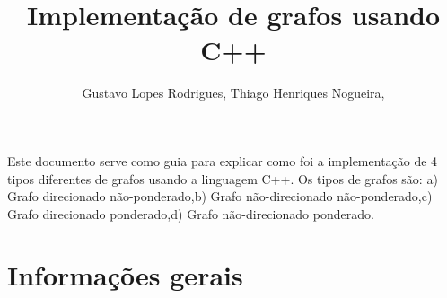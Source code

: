 \documentclass[12pt]{article}
\title{Implementação de grafos usando C++}
\author{Gustavo Lopes Rodrigues\inst{1}, Thiago Henriques Nogueira\inst{2},}
\begin{document}
 

\maketitle

\begin{resumo} 
  Este documento serve como guia para explicar como 
  foi a implementação
  de 4 tipos diferentes de grafos usando a linguagem C++. Os tipos de 
  grafos são: a) Grafo direcionado não-ponderado,b) Grafo não-direcionado 
  não-ponderado,c) Grafo direcionado ponderado,d) Grafo não-direcionado 
  ponderado.
\end{resumo}


\section{Informações gerais}
\end{document}
